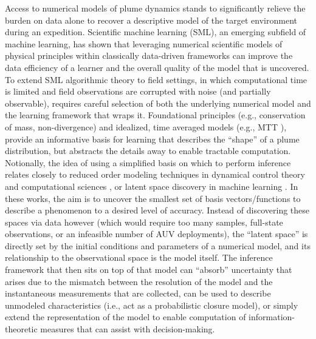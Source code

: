 Access to numerical models of plume dynamics stands to significantly relieve the burden on data alone to recover a descriptive model of the target environment during an expedition.
Scientific machine learning (SML), an emerging subfield of machine learning, has shown that leveraging numerical scientific models of physical principles within classically data-driven frameworks \autocite{raissi2019physics, sapsis2009dynamically, mohan2019compressed,raissi2018numerical,kulkarni2019advection, brunton2016discovering,jiahao2021knowledge} can improve the data efficiency of a learner and the overall quality of the model that is uncovered.
To extend SML algorithmic theory to field settings, in which computational time is limited and field observations are corrupted with noise (and partially observable), requires careful selection of both the underlying numerical model and the learning framework that wraps it.
Foundational principles (e.g., conservation of mass, non-divergence) and idealized, time averaged models (e.g., MTT \autocite{morton1956turbulent}), provide an informative basis for learning that describes the ``shape'' of a plume distribution, but abstracts the details away to enable tractable computation.
Notionally, the idea of using a simplified basis on which to perform inference relates closely to reduced order modeling techniques in dynamical control theory and computational sciences \autocite{lucia2004reduced,burkardt2006pod,salam2019adaptive}, or latent space discovery in machine learning \autocite{voynov2020unsupervised,lu2020extracting}.
In these works, the aim is to uncover the smallest set of basis vectors/functions to describe a phenomenon to a desired level of accuracy.
Instead of discovering these spaces via data however (which would require too many samples, full-state observations, or an infeasible number of AUV deployments), the ``latent space'' is directly set by the initial conditions and parameters of a numerical model, and its relationship to the observational space is the model itself.
The inference framework that then sits on top of that model can ``absorb'' uncertainty that arises due to the mismatch between the resolution of the model and the instantaneous measurements that are collected, can be used to describe unmodeled characteristics (i.e., act as a probabilistic closure model), or simply extend the representation of the model to enable computation of information-theoretic measures that can assist with decision-making.


